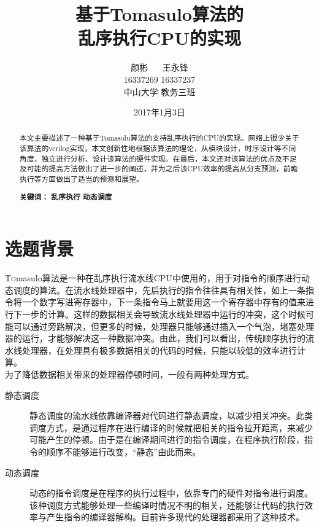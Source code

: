 \documentclass[twoside]{article}
\title{\vspace{-15mm}\fontsize{24pt}{10pt}\selectfont\textbf{基于Tomasulo算法的\\乱序执行CPU的实现}} %
\author{
\large
\textsc{颜彬 \(\quad\) 王永锋}\\[2mm] %
\textsc{16337269 16337237} \\ [2mm]
\normalsize 中山大学 教务三班  \\ %
\vspace{-5mm}
}
\date{2017年1月3日}
\begin{document}
\maketitle %

\thispagestyle{fancy} %

\begin{abstract}
	本文主要描述了一种基于Tomasolu算法的支持乱序执行的CPU的实现。网络上很少关于该算法的verilog实现，本文创新性地根据该算法的理论，从模块设计，时序设计等不同角度，独立进行分析、设计该算法的硬件实现。在最后，本文还对该算法的优点及不足及可能的提高方法做出了进一步的阐述，并为之后该CPU效率的提高从分支预测，前瞻执行等方面做出了适当的预测和展望。

	\textbf{关键词： }\textbf{乱序执行} \textbf{动态调度}
\end{abstract}


\section{选题背景}
\lettrine[nindent=0em,lines=3]{T}omasulo算法是一种在乱序执行流水线CPU中使用的，用于对指令的顺序进行动态调度的算法。在流水线处理器中，先后执行的指令往往具有相关性，如上一条指令将一个数字写进寄存器中，下一条指令马上就要用这一个寄存器中存有的值来进行下一步的计算。这样的数据相关会导致流水线处理器中运行的冲突，这个时候可能可以通过旁路解决，但更多的时候，处理器只能够通过插入一个气泡，堵塞处理器的运行，才能够解决这一种数据冲突。由此，我们可以看出，传统顺序执行的流水线处理器，在处理具有极多数据相关的代码的时候，只能以较低的效率进行计算。\\

为了降低数据相关带来的处理器停顿时间，一般有两种处理方式。\cite{book:zcs}
\begin{description}
	\item[静态调度] 静态调度的流水线依靠编译器对代码进行静态调度，以减少相关冲突。此类调度方式，是通过程序在进行编译的时候就把相关的指令拉开距离，来减少可能产生的停顿。由于是在编译期间进行的指令调度，在程序执行阶段，指令的顺序不能够进行改变，“静态”由此而来。
	\item[动态调度]	动态的指令调度是在程序的执行过程中，依靠专门的硬件对指令进行调度。该种调度方式能够处理一些编译时情况不明的相关，还能够让代码的执行效率与产生指令的编译器解构。目前许多现代的处理器都采用了这种技术。
\end{description}
\end{document}
